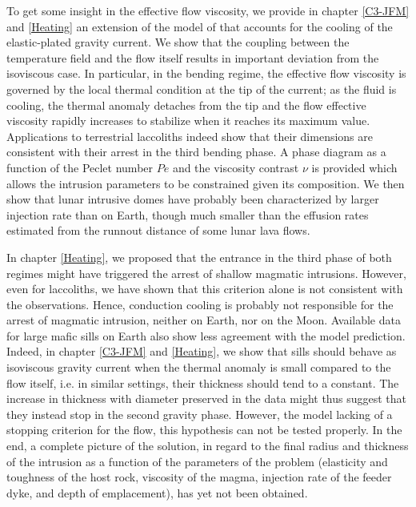 To get  some insight in  the effective  flow viscosity, we  provide in
chapter \ref{C3-JFM}  and \ref{Heating} an  extension of the  model of
\citet{Michaut:2011kg}   that  accounts   for  the   cooling  of   the
elastic-plated gravity current.  We show that the coupling between the
temperature field and  the flow itself results  in important deviation
from the  isoviscous case. In  particular, in the bending  regime, the
effective flow viscosity is governed by the local thermal condition at
the tip of  the current; as the fluid is  cooling, the thermal anomaly
detaches  from  the  tip  and the  flow  effective  viscosity  rapidly
increases to stabilize when it reaches its maximum value. Applications
to  terrestrial  laccoliths  indeed  show that  their  dimensions  are
consistent  with their  arrest in  the  third bending  phase. A  phase
diagram as  a function  of the  Peclet number  $Pe$ and  the viscosity
contrast $\nu$ is provided which allows the intrusion parameters to be
constrained given its  composition. We then show  that lunar intrusive
domes have probably  been characterized by larger  injection rate than
on Earth, though  much smaller than the effusion  rates estimated from
the runnout distance of some lunar lava flows.

In chapter \ref{Heating},  we proposed that the entrance  in the third
phase  of both  regimes might  have  triggered the  arrest of  shallow
magmatic intrusions.  However, even for laccoliths, we have shown that
this criterion alone  is not consistent with  the observations. Hence,
conduction  cooling is  probably  not responsible  for  the arrest  of
magmatic intrusion, neither on Earth,  nor on the Moon. Available data
for large mafic sills on Earth also show less agreement with the model
prediction.   Indeed, in  chapter \ref{C3-JFM}  and \ref{Heating},  we
show that sills  should behave as isoviscous gravity  current when the
thermal anomaly is small compared to the flow itself, i.e.  in similar
settings, their thickness should tend  to a constant.  The increase in
thickness with diameter preserved in  the data might thus suggest that
they  instead stop  in the  second gravity  phase. However,  the model
lacking of a stopping criterion for  the flow, this hypothesis can not
be tested properly.   In the end, a complete picture  of the solution,
in regard  to the  final radius  and thickness of  the intrusion  as a
function of the parameters of the problem (elasticity and toughness of
the host  rock, viscosity of the  magma, injection rate of  the feeder
dyke, and depth of emplacement), has yet not been obtained.

